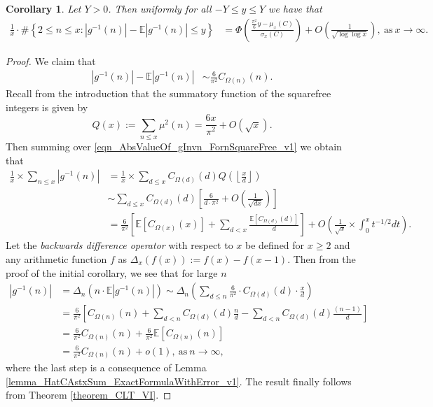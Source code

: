 \documentclass[11pt,reqno,a4letter]{article}
\numberwithin{figure}{section}
\numberwithin{table}{section}
\newcommand{\Floor}[2]{\ensuremath{\left\lfloor \frac{#1}{#2} \right\rfloor}}
\theoremstyle{plain}
\newtheorem{cor}[theorem]{Corollary}
\numberwithin{theorem}{section}
\theoremstyle{definition}
\begin{document}
\begin{cor} 
\label{cor_CLT_VII} 
Let $Y > 0$. 
Then uniformly for all $-Y \leq y \leq Y$ 
we have that 
\begin{align*} 
\frac{1}{x} \cdot \#\left\{2 \leq n \leq x:|g^{-1}(n)| - 
     \mathbb{E}|g^{-1}(n)| \leq y\right\} & = 
     \Phi\left(\frac{\frac{\pi^2}{6} y - \mu_x(C)}{\sigma_x(C)}\right) + 
     O\left(\frac{1}{\sqrt{\log\log x}}\right), 
     \mathrm{\ as\ } x \rightarrow \infty. 
\end{align*} 
\end{cor} 
\begin{proof} 
We claim that 
\begin{align*} 
|g^{-1}(n)| - \mathbb{E}|g^{-1}(n)| & \sim \frac{6}{\pi^2} C_{\Omega(n)}(n). 
\end{align*} 
Recall from the introduction that the summatory function of the 
squarefree integers is given by 
\[
Q(x) := \sum_{n \leq x} \mu^2(n) = \frac{6x}{\pi^2} + O(\sqrt{x}). 
\]
Then summing over \eqref{eqn_AbsValueOf_gInvn_FornSquareFree_v1} 
we obtain that 
\begin{align*} 
\frac{1}{x} \times \sum_{n \leq x} |g^{-1}(n)| & = \frac{1}{x} \times \sum_{d \leq x} 
     C_{\Omega(d)}(d) Q\left(\Floor{x}{d}\right) \\ 
     & \sim \sum_{d \leq x} C_{\Omega(d)}(d) \left[\frac{6}{d \cdot \pi^2} + O\left(\frac{1}{\sqrt{dx}}\right) 
     \right] \\ 
     & = \frac{6}{\pi^2} \left[\mathbb{E}[C_{\Omega(x)}(x)] + \sum_{d<x} 
     \frac{\mathbb{E}[C_{\Omega(d)}(d)]}{d}\right] + 
     O\left(\frac{1}{\sqrt{x}} \times \int_0^{x} t^{-1/2} dt\right). 
\end{align*} 
Let the \emph{backwards difference operator} with respect to $x$ 
be defined for $x \geq 2$ and any arithmetic function $f$ as 
$\Delta_x(f(x)) := f(x) - f(x-1)$. Then from the proof of the initial corollary, 
we see that for large $n$ 
\begin{align*} 
|g^{-1}(n)| & = \Delta_n(n \cdot \mathbb{E}|g^{-1}(n)|) 
     \sim \Delta_n\left(\sum_{d \leq n} \frac{6}{\pi^2} \cdot C_{\Omega(d)}(d) \cdot \frac{x}{d}\right) \\ 
     & = \frac{6}{\pi^2}\left[C_{\Omega(n)}(n) + \sum_{d < n} C_{\Omega(d)}(d) \frac{n}{d} - 
     \sum_{d<n} C_{\Omega(d)}(d) \frac{(n-1)}{d}\right] \\ 
     & = \frac{6}{\pi^2} C_{\Omega(n)}(n) + \frac{6}{\pi^2} \mathbb{E}[C_{\Omega(n)}(n)] \\ 
     & = \frac{6}{\pi^2} C_{\Omega(n)}(n) + o(1), 
     \mathrm{\ as\ } n \rightarrow \infty, 
\end{align*} 
where the last step is a consequence of 
Lemma \ref{lemma_HatCAstxSum_ExactFormulaWithError_v1}. 
The result finally follows from Theorem \ref{theorem_CLT_VI}. 
\end{proof} 
\end{document}
